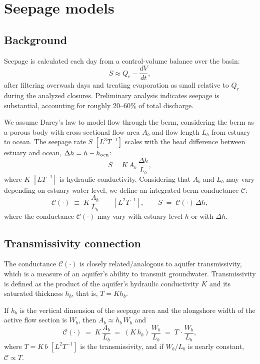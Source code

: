 \documentclass[preprint,12pt,authoryear]{elsarticle}
\begin{document}
\section*{Seepage models}

\subsection*{Background}



 Seepage is calculated each day from a control-volume balance over the basin:
\[
S \approx Q_r - \frac{dV}{dt},
\]
after filtering overwash days and treating evaporation as small relative to $Q_r$ during the analyzed closures. Preliminary analysis indicates seepage is substantial, accounting for roughly 20--60\% of total discharge.

We assume Darcy's law to model flow through the berm, considering the berm as a porous body with cross-sectional flow area $A_b$ and flow length $L_b$ from estuary to ocean. The seepage rate $S$ $[L^3T^{-1}]$ scales with the head difference between estuary and ocean,  $\Delta h = h - h_{\rm ocn}$:
\[
S = K\,A_b\,\frac{\Delta h}{L_b},
\]
where $K$ $[LT^{-1}]$ is hydraulic conductivity. Considering that $A_b$ and $L_b$ may vary depending on estuary water level, we define an {integrated berm conductance} $\mathcal{C}$:
\[
\mathcal{C}(\cdot) \;\equiv\; K\,\frac{A_b}{L_b}\qquad [L^2T^{-1}],
\qquad
S \;=\; \mathcal{C}(\cdot)\,\Delta h,
\]
where the conductance  $\mathcal{C}(\cdot)$ may vary with estuary level $h$ or with $\Delta h$.

\subsection*{Transmissivity connection}

The conductance $\mathcal{C}(\cdot)$ is closely related/analogous to aquifer transmissivity, which is a measure of an aquifer's ability to transmit groundwater. Transmissivity is  defined as the product of the aquifer's hydraulic conductivity $K$ and its saturated thickness $h_b$, that is, 
 \(T=K h_b \). 

 If $h_b$ is the vertical dimension of the seepage area and the alongshore width of the active flow section is $W_b$, then $A_b \approx h_b\,W_b$ and
\[
\mathcal{C}(\cdot) \;=\; K\,\frac{A_b}{L_b}
   \;=\; (K\,h_b)\,\frac{W_b}{L_b}
   \;=\; T\, \cdot \frac{W_b}{L_b} ,
\]
where $T=K\,b$ $[L^2T^{-1}]$ is the transmissivity, and if $W_b/L_b$ is nearly constant, $\mathcal{C} \propto T$. 
\end{document}
